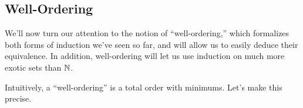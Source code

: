 \documentclass[../notes.tex]{subfiles}
\begin{document}
\subsection{Well-Ordering}
We'll now turn our attention to the notion of ``well-ordering,'' which formalizes both forms of induction we've seen so far, and will allow us to easily deduce their equivalence. In addition, well-ordering will let us use induction on much more exotic sets than $\mathbb N$.

Intuitively, a ``well-ordering'' is a total order with minimums. Let's make this precise.
\end{document}
